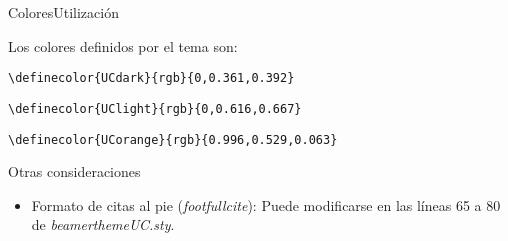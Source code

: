 \documentclass[handout,%
		aspectratio=43,%
		9pt]{beamer}
\begin{document}
\begin{frame}[fragile]{Colores}{Utilización}

Los colores definidos por el tema son:
\color{UCdark}
\begin{verbatim}
\definecolor{UCdark}{rgb}{0,0.361,0.392}
\end{verbatim}
\color{UClight}
\begin{verbatim}
\definecolor{UClight}{rgb}{0,0.616,0.667}
\end{verbatim}
\color{UCorange}
\begin{verbatim}
\definecolor{UCorange}{rgb}{0.996,0.529,0.063}
\end{verbatim}
\color{UCdark}
\end{frame}

\begin{frame}{Otras consideraciones}

\begin{itemize}
\item Formato de citas al pie (\emph{footfullcite}): Puede modificarse en las líneas 65 a 80 de \textit{beamerthemeUC.sty}.
\end{itemize}

\end{frame}
\end{document}

